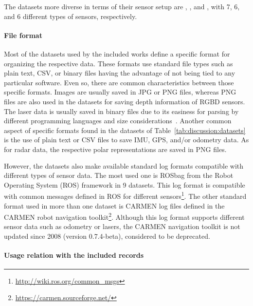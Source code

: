 The datasets more diverse in terms of their sensor setup are , , and , with 7, 6, and 6 different types of sensors, respectively.


\paragraph{File format}

Most of the datasets used by the included works define a specific format for organizing the respective data. These formats use standard file types such as plain text, CSV, or binary files having the advantage of not being tied to any particular software. Even so, there are common characteristics between those specific formats.
Images are usually saved in JPG or PNG files, whereas PNG files are also used in the datasets for saving depth information of RGBD sensors.
The laser data is usually saved in binary files due to its easiness for parsing by different programming languages and size considerations~\parencite{dataset:kitti,dataset:oxford-robotcar}.
Another common aspect of specific formats found in the datasets of Table~\ref{tab:discussion:datasets} is the use of plain text or CSV files to save IMU, GPS, and/or odometry data.
As for radar data, the respective polar representations are saved in PNG files.

However, the datasets also make available standard log formats compatible with different types of sensor data.
The most used one is ROSbag from the Robot Operating System (ROS) framework in 9 datasets. This log format is compatible with common messages defined in ROS for different sensors\footnote{\url{http://wiki.ros.org/common_msgs}}.
The other standard format used in more than one dataset is CARMEN log files defined in the CARMEN robot navigation toolkit\footnote{\url{https://carmen.sourceforge.net/}}. Although this log format supports different sensor data such as odometry or lasers, the CARMEN navigation toolkit is not updated since 2008 (version 0.7.4-beta), considered to be deprecated.


\paragraph{Usage relation with the included records}

